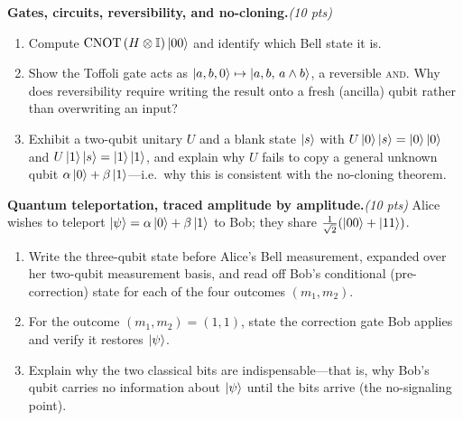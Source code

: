 \documentclass[11pt]{article}
\newcommand{\id}{\mathbb{I}}
\newcommand{\CNOT}{\mathrm{CNOT}}
\newcommand{\pts}[1]{\hfill{\normalfont\itshape(#1 pts)}}
\begin{document}
\begin{problems}
\item \textbf{Gates, circuits, reversibility, and no-cloning.}\pts{10}
\begin{enumerate}[label=(\alph*),nosep,leftmargin=2em]
  \item Compute $\CNOT\,(H\otimes\id)\ket{00}$ and identify which Bell state it is.
  \item Show the Toffoli gate acts as $\ket{a,b,0}\mapsto\ket{a,b,\,a\wedge b}$, a
        reversible \textsc{and}. Why does reversibility require writing the result
        onto a fresh (ancilla) qubit rather than overwriting an input?
  \item Exhibit a two-qubit unitary $U$ and a blank state $\ket{s}$ with
        $U\ket{0}\ket{s}=\ket{0}\ket{0}$ and $U\ket{1}\ket{s}=\ket{1}\ket{1}$, and
        explain why $U$ fails to copy a general unknown qubit
        $\alpha\ket0+\beta\ket1$---i.e.\ why this is consistent with the no-cloning
        theorem.
\end{enumerate}

\item \textbf{Quantum teleportation, traced amplitude by amplitude.}\pts{10}
Alice wishes to teleport $\ket{\psi}=\alpha\ket0+\beta\ket1$ to Bob; they share
$\tfrac{1}{\sqrt2}(\ket{00}+\ket{11})$.
\begin{enumerate}[label=(\alph*),nosep,leftmargin=2em]
  \item Write the three-qubit state before Alice's Bell measurement, expanded over
        her two-qubit measurement basis, and read off Bob's conditional
        (pre-correction) state for each of the four outcomes $(m_1,m_2)$.
  \item For the outcome $(m_1,m_2)=(1,1)$, state the correction gate Bob applies and
        verify it restores $\ket{\psi}$.
  \item Explain why the two classical bits are indispensable---that is, why Bob's
        qubit carries no information about $\ket{\psi}$ until the bits arrive (the
        no-signaling point).
\end{enumerate}
\end{problems}
\end{document}
